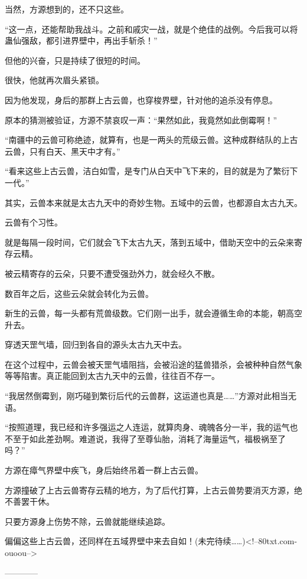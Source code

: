 \begin{this_body}
当然，方源想到的，还不只这些。

“这一点，还能帮助我战斗。之前和戚灾一战，就是个绝佳的战例。今后我可以将蛊仙强敌，都引进界壁中，再出手斩杀！”

但他的兴奋，只是持续了很短的时间。

很快，他就再次眉头紧锁。

因为他发现，身后的那群上古云兽，也穿梭界壁，针对他的追杀没有停息。

原本的猜测被验证，方源不禁哀叹一声：“果然如此，我竟然如此倒霉啊！”

“南疆中的云兽可称绝迹，就算有，也是一两头的荒级云兽。这种成群结队的上古云兽，只有白天、黑天中才有。”

“看来这些上古云兽，洁白如雪，是专门从白天中飞下来的，目的就是为了繁衍下一代。”

其实，云兽本来就是太古九天中的奇妙生物。五域中的云兽，也都源自太古九天。

云兽有个习性。

就是每隔一段时间，它们就会飞下太古九天，落到五域中，借助天空中的云朵来寄存云精。

被云精寄存的云朵，只要不遭受强劲外力，就会经久不散。

数百年之后，这些云朵就会转化为云兽。

新生的云兽，每一头都有荒兽级数。它们刚一出手，就会遵循生命的本能，朝高空升去。

穿透天罡气墙，回归到各自的源头太古九天中去。

在这个过程中，云兽会被天罡气墙阻挡，会被沿途的猛兽猎杀，会被种种自然气象等等陷害。真正能回到太古九天中的云兽，往往百不存一。

“我居然倒霉到，刚巧碰到繁衍后代的云兽群，这运道也真是……”方源对此相当无语。

“按照道理，我已经和许多强运之人连运，就算肉身、魂魄各分一半，我的运气也不至于如此差劲啊。难道说，我得了至尊仙胎，消耗了海量运气，福极祸至了吗？”

方源在瘴气界壁中疾飞，身后始终吊着一群上古云兽。

方源撞破了上古云兽寄存云精的地方，为了后代打算，上古云兽势要消灭方源，绝不善罢干休。

只要方源身上伤势不除，云兽就能继续追踪。

偏偏这些上古云兽，还同样在五域界壁中来去自如！(未完待续……)<!--80txt.com-ouoou-->

------------

\end{this_body}

